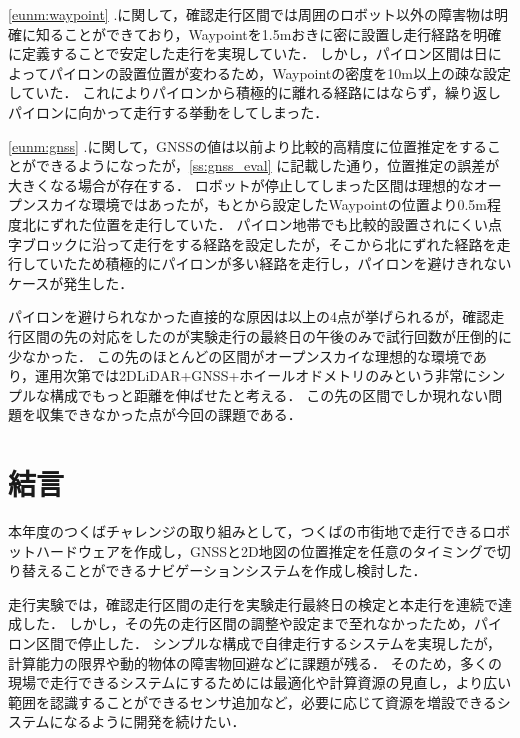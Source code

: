 \documentclass[platex,dvipdfmx]{rbproceedings}
\newcommand{\pkg}[1]{\textsf{#1}}
\begin{document}
\ref{eunm:waypoint} .に関して，確認走行区間では周囲のロボット以外の障害物は明確に知ることができており，Waypointを1.5mおきに密に設置し走行経路を明確に定義することで安定した走行を実現していた．
しかし，パイロン区間は日によってパイロンの設置位置が変わるため，Waypointの密度を10m以上の疎な設定していた．
これによりパイロンから積極的に離れる経路にはならず，繰り返しパイロンに向かって走行する挙動をしてしまった．

\ref{eunm:gnss} .に関して，GNSSの値は以前より比較的高精度に位置推定をすることができるようになったが，\ref{ss:gnss_eval} に記載した通り，位置推定の誤差が大きくなる場合が存在する．
ロボットが停止してしまった区間は理想的なオープンスカイな環境ではあったが，もとから設定したWaypointの位置より0.5m程度北にずれた位置を走行していた．
パイロン地帯でも比較的設置されにくい点字ブロックに沿って走行をする経路を設定したが，そこから北にずれた経路を走行していたため積極的にパイロンが多い経路を走行し，パイロンを避けきれないケースが発生した．

パイロンを避けられなかった直接的な原因は以上の4点が挙げられるが，確認走行区間の先の対応をしたのが実験走行の最終日の午後のみで試行回数が圧倒的に少なかった．
この先のほとんどの区間がオープンスカイな理想的な環境であり，運用次第では2DLiDAR+GNSS+ホイールオドメトリのみという非常にシンプルな構成でもっと距離を伸ばせたと考える．
この先の区間でしか現れない問題を収集できなかった点が今回の課題である．

\section{結言}
本年度のつくばチャレンジの取り組みとして，つくばの市街地で走行できるロボットハードウェアを作成し，GNSSと2D地図の位置推定を任意のタイミングで切り替えることができるナビゲーションシステムを作成し検討した．

走行実験では，確認走行区間の走行を実験走行最終日の検定と本走行を連続で達成した．
しかし，その先の走行区間の調整や設定まで至れなかったため，パイロン区間で停止した．
シンプルな構成で自律走行するシステムを実現したが，計算能力の限界や動的物体の障害物回避などに課題が残る．
そのため，多くの現場で走行できるシステムにするためには最適化や計算資源の見直し，より広い範囲を認識することができるセンサ追加など，必要に応じて資源を増設できるシステムになるように開発を続けたい．




\end{document}
